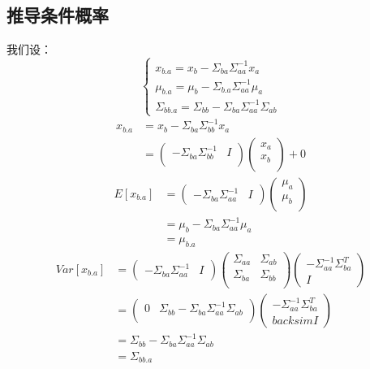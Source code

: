 \documentclass{report}
\begin{document}
\subsection{推导条件概率}
我们设：
$$
\begin{cases}
x_{b.a}=x_b - \Sigma_{ba} \Sigma_{aa}^{-1} x_a \\
\mu_{b.a} = \mu_b - \Sigma_{b.a} \Sigma_{aa}^{-1} \mu_a \\
\Sigma_{bb.a}=\Sigma_{bb} - \Sigma_{ba} \Sigma_{aa}^{-1} \Sigma_{ab}
\end{cases}
$$
$$
\begin{aligned}
x_{b.a} &= x_b - \Sigma_{ba} \Sigma_{bb}^{-1} x_a \\
&=
\left (
\begin{matrix}
- \Sigma_{ba} \Sigma_{bb}^{-1} & I\\
\end{matrix}
\right )
\left (
\begin{matrix}
x_a \\
x_b \\
\end{matrix}
\right ) + 0
\end{aligned}
$$
$$
\begin{aligned}
E[x_{b.a}]
&=
\left (
\begin{matrix}
-\Sigma_{ba} \Sigma_{aa}^{-1} & I
\end{matrix}
\right )
\left (
\begin{matrix}
\mu_a \\
\mu_b \\
\end{matrix}
\right )\\
&=\mu_b - \Sigma_{ba} \Sigma_{aa}^{-1} \mu_a\\
&=\mu_{b.a}
\end{aligned}
$$
$$
\begin{aligned}
Var[x_{b.a}]
&= \left ( \begin{matrix}
-\Sigma_{ba} \Sigma_{aa}^{-1} & I
\end{matrix} \right )
\left ( \begin{matrix}
\Sigma_{aa} & \Sigma_{ab} \\
\Sigma_{ba} & \Sigma_{bb} \\
\end{matrix} \right )
\left ( \begin{matrix}
-\Sigma_{aa}^{-1} \Sigma_{ba}^T \\
I
\end{matrix} \right ) \\
&=\left ( \begin{matrix}
0 & \Sigma_{bb} - \Sigma_{ba} \Sigma_{aa}^{-1} \Sigma_{ab} \\
\end{matrix} \right ) 
\left ( \begin{matrix}
-\Sigma_{aa}^{-1} \Sigma_{ba}^T \\backsim
I
\end{matrix} \right ) \\
&=\Sigma_{bb} - \Sigma_{ba} \Sigma_{aa}^{-1} \Sigma_{ab}\\
&=\Sigma_{bb.a}
\end{aligned}
$$
\end{document}
